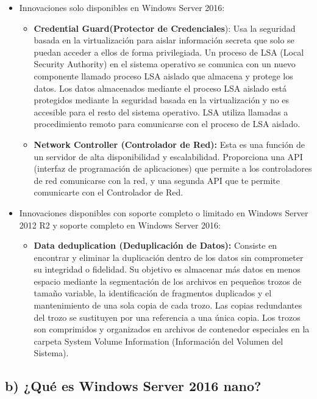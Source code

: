 	\begin{itemize}
		\item Innovaciones solo disponibles en Windows Server 2016:
		\begin{itemize}
			\item \textbf{Credential Guard\cite{tercero}(Protector de Credenciales}): Usa la seguridad basada en la virtualización para aislar información secreta que solo se puedan acceder a ellos de forma privilegiada.
			Un proceso de LSA (Local Security Authority) en el sistema operativo se comunica con un nuevo componente llamado proceso LSA aislado que almacena y protege los datos. Los datos almacenados mediante el proceso LSA aislado está protegidos mediante la seguridad basada en la virtualización y no es accesible para el resto del sistema operativo. LSA utiliza llamadas a procedimiento remoto para comunicarse con el proceso de LSA aislado.
			\item \textbf{Network Controller\cite{cuarto} (Controlador de Red):} Esta es una función de un servidor de alta disponibilidad y escalabilidad. Proporciona una API (interfaz de programación de aplicaciones) que permite a los controladores de red comunicarse con la red, y una segunda API que te permite comunicarte con el Controlador de Red.
		\end{itemize}
		\item Innovaciones disponibles con soporte completo o limitado en Windows Server 2012 R2 y soporte completo en Windows Server 2016:
		\begin{itemize}
			\item \textbf{Data deduplication\cite{quinto} (Deduplicación de Datos):} Consiste en encontrar y eliminar la duplicación dentro de los datos sin comprometer su integridad o fidelidad. Su objetivo es almacenar más datos en menos espacio mediante la segmentación de los archivos en pequeños trozos de tamaño variable, la identificación de fragmentos duplicados y el mantenimiento de una sola copia de cada trozo. Las copias redundantes del trozo se sustituyen por una referencia a una única copia. Los trozos son comprimidos y organizados en archivos de contenedor especiales en la carpeta System Volume Information (Información del Volumen del Sistema).
		\end{itemize}
	\end{itemize}
	
	\subsection{b) ¿Qué es Windows Server 2016 nano?}
	

